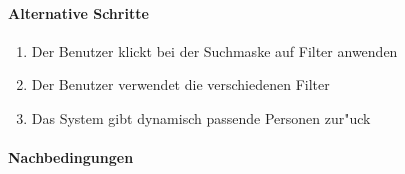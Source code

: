   \paragraph{Alternative Schritte}
  \begin{enumerate}
   \item Der Benutzer klickt bei der Suchmaske auf \dq Filter anwenden\dq
   \item Der Benutzer verwendet die verschiedenen Filter
   \item Das System gibt dynamisch passende Personen zur"uck
  \end{enumerate}

  \paragraph{Nachbedingungen}
